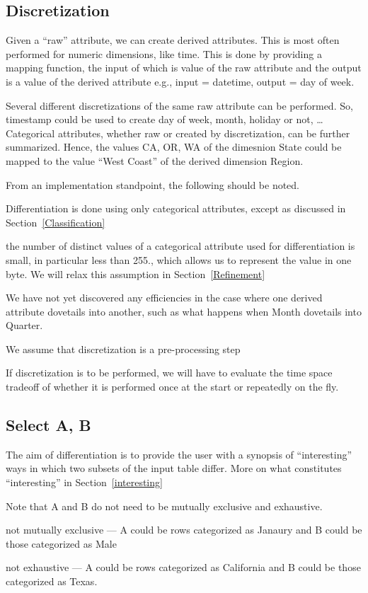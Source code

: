 \subsection{Discretization}
\label{Discretization}

Given a ``raw'' attribute, we can create derived attributes. This is most often
performed for numeric dimensions, like time. This is done by providing a mapping
function, the input of which is value of the raw attribute and the output is a
value of the derived attribute e.g., input = datetime, output = day of week.

Several different discretizations of the same raw attribute can be performed.  So, timestamp could be used to create day of week, month, holiday or not, \ldots
Categorical attributes, whether raw or created by discretization, can be further
summarized. Hence, the values CA, OR, WA of the dimesnion State could be mapped to the value ``West Coast''  of the derived dimension Region.

From an implementation standpoint, the following should be noted.
\be
\item Differentiation is done using only categorical attributes, except
as discussed in Section~\ref{Classification}
\item the number of distinct values of a categorical 
attribute used for differentiation is small, in particular less than 255., which
allows us to represent the value in one byte. We will relax this assumption in
Section~\ref{Refinement}
\item 
We have not yet discovered any efficiencies in the case where one derived
attribute dovetails into another, such as what happens when Month 
dovetails into Quarter.
\item We assume that discretization is a pre-processing step 
\item If discretization is to be performed, we will have to evaluate
the time space tradeoff of whether it is performed once at the start or
repeatedly on the fly.
\ee


\subsection{Select A, B}
\label{SelectAB}

The aim of differentiation is to provide the user with a synopsis of
``interesting'' ways in which two subsets of the input table differ. 
More on what constitutes ``interesting'' in Section~\ref{interesting}

Note that A and B do not need to be mutually exclusive and exhaustive. 
\bi
\item not mutually exclusive --- 
A could be rows categorized as Janaury and B could be those
categorized as Male
\item not exhaustive  ---
A could be rows categorized as California and B could be those
categorized as Texas. 
\ei

